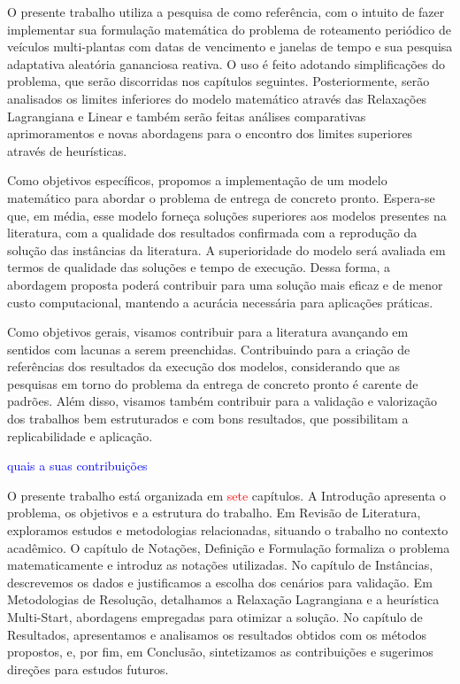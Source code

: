 O presente trabalho utiliza a pesquisa de \cite{cantu} como referência, com o intuito de fazer implementar sua formulação matemática do problema de roteamento periódico de veículos multi-plantas com datas de vencimento e janelas de tempo e sua pesquisa adaptativa aleatória gananciosa reativa. O uso é feito adotando  simplificações do problema, que serão discorridas nos capítulos seguintes. Posteriormente, serão analisados os limites inferiores do modelo matemático através das Relaxações Lagrangiana e Linear e também serão feitas análises comparativas aprimoramentos e novas abordagens para o encontro dos limites superiores através de heurísticas.



Como objetivos específicos, propomos a implementação de um modelo matemático para abordar o problema de entrega de concreto pronto. Espera-se que, em média, esse modelo forneça soluções superiores aos modelos presentes na literatura, com a qualidade dos resultados confirmada com a reprodução da solução das instâncias da literatura. A superioridade do modelo será avaliada em termos de qualidade das soluções e tempo de execução. Dessa forma, a abordagem proposta poderá contribuir para uma solução mais eficaz e de menor custo computacional, mantendo a acurácia necessária para aplicações práticas.

Como objetivos gerais, visamos contribuir para a literatura avançando em sentidos com lacunas a serem preenchidas. Contribuindo para a criação de referências dos resultados da execução dos modelos, considerando que as pesquisas em torno do problema da entrega de concreto pronto é carente de padrões. Além disso, visamos também contribuir para a validação e valorização dos trabalhos bem estruturados e com bons resultados, que possibilitam a replicabilidade e aplicação. 

\textcolor{blue}{ quais a suas contribuições}


O presente trabalho está organizada em \textcolor{red}{sete} capítulos. A Introdução apresenta o problema, os objetivos e a estrutura do trabalho. Em Revisão de Literatura, exploramos estudos e metodologias relacionadas, situando o trabalho no contexto acadêmico. O capítulo de Notações, Definição e Formulação formaliza o problema matematicamente e introduz as notações utilizadas. No capítulo de Instâncias, descrevemos os dados e justificamos a escolha dos cenários para validação. Em Metodologias de Resolução, detalhamos a Relaxação Lagrangiana e a heurística Multi-Start, abordagens empregadas para otimizar a solução. No capítulo de Resultados, apresentamos e analisamos os resultados obtidos com os métodos propostos, e, por fim, em Conclusão, sintetizamos as contribuições e sugerimos direções para estudos futuros.

